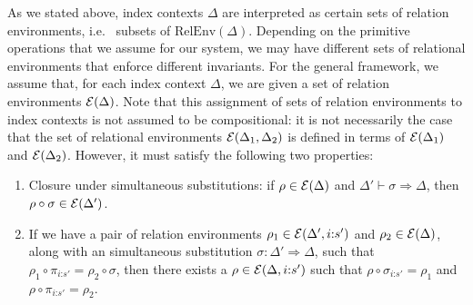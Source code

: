 As we stated above, index contexts $\Delta$ are interpreted as certain
sets of relation environments, i.e.~ subsets of
$\mathrm{RelEnv}(\Delta)$. Depending on the primitive operations that
we assume for our system, we may have different sets of relational
environments that enforce different invariants. For the general
framework, we assume that, for each index context $\Delta$, we are
given a set of relation environments $\mathcal{E}(\Delta)$. Note that
this assignment of sets of relation environments to index contexts is
not assumed to be compositional: it is not necessarily the case that
the set of relational environments $\mathcal{E}(\Delta_1,\Delta_2)$ is
defined in terms of $\mathcal{E}(\Delta_1)$ and
$\mathcal{E}(\Delta_2)$. However, it must satisfy the following two
properties:
\begin{enumerate}
\item Closure under simultaneous substitutions: if $\rho \in
  \mathcal{E}(\Delta)$ and $\Delta' \vdash \sigma \Rightarrow \Delta$,
  then $\rho \circ \sigma \in \mathcal{E}(\Delta')$.
\item If we have a pair of relation environments $\rho_1 \in
  \mathcal{E}(\Delta', i\mathord:s')$ and $\rho_2 \in
  \mathcal{E}(\Delta)$, along with an simultaneous substitution $\sigma
  : \Delta' \Rightarrow \Delta$, such that $\rho_1 \circ
  \pi_{i\mathord:s'} = \rho_2 \circ \sigma$, then there exists a $\rho
  \in \mathcal{E}(\Delta, i\mathord:s')$ such that $\rho \circ
  \sigma_{i\mathord:s'} = \rho_1$ and $\rho \circ \pi_{i\mathord:s'} =
  \rho_2$.
\end{enumerate}

